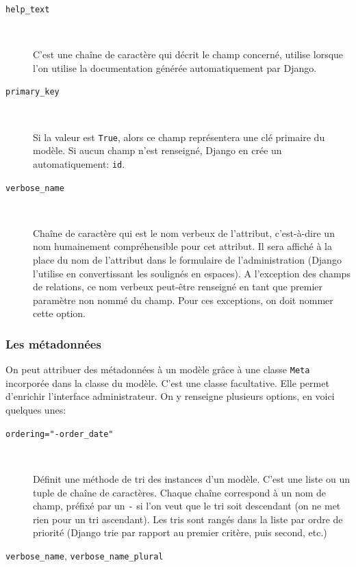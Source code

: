 \documentclass[a4paper, 10pt]{article}
\begin{document}
{\begin{description}
	\item[\texttt{help_text}]~

	      C'est une chaîne de caractère qui décrit le champ concerné, utilise lorsque l'on utilise la documentation générée automatiquement par Django.

	\item[\texttt{primary_key}]~

	      Si la valeur est \texttt{True}, alors ce champ représentera une clé primaire du modèle. Si aucun champ n'est renseigné, Django en crée un automatiquement: \texttt{id}.

	\item[\texttt{verbose_name}]~

	      Chaîne de caractère qui est le \og nom verbeux \fg{} de l'attribut, c'est-à-dire un nom humainement compréhensible pour cet attribut. Il sera affiché à la place du nom de l'attribut dans le formulaire de l'administration (Django l'utilise en convertissant les soulignés en espaces). A l'exception des champs de relations, ce nom verbeux peut-être renseigné en tant que premier paramètre non nommé du champ. Pour ces exceptions, on doit nommer cette option.
\end{description}

\subsubsection{Les métadonnées}
On  peut attribuer des métadonnées à un modèle grâce à une classe \texttt{Meta} incorporée dans la classe du modèle. C'est une classe facultative. Elle permet d'enrichir l'interface administrateur. On y renseigne plusieurs options, en voici quelques unes:
\begin{description}
	\item[\texttt{ordering="-order_date"}]~

	      Définit une méthode de tri des instances d'un modèle. C'est une liste ou un tuple de chaîne de caractères. Chaque chaîne correspond à un nom de champ, préfixé par un \texttt{-} si l'on veut que le tri soit descendant (on ne met rien pour un tri ascendant). Les tris sont rangés dans la liste par ordre de priorité (Django trie par rapport au premier critère, puis second, etc.)

	\item[\texttt{verbose_name}, \texttt{verbose_name_plural}]~


\end{description}}
\end{document}
